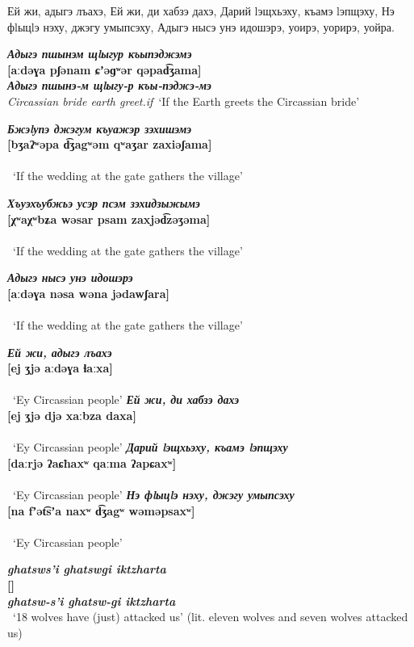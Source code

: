 \documentclass[a4paper,12pt]{book}
\newcommand{\1}[1]{\textbf{\emph{#1}}} %
\newcommand{\2}[1]{\textbf{[#1]}} %
\newcommand{\3}[1]{\fontsize{11pt}{0cm}\textbf{\emph{#1}}} %
\newcommand{\4}[1]{\fontsize{10pt}{0cm}\emph{#1}}	%
\newcommand{\5}[1]{\textbf{/#1/}} %
\newcommand{\6}[1]{\textbf{[#1]}} %
\newcommand{\7}[1]{\fontsize{12pt}{0cm}\emph{#1}} %
\newcommand{\8}[1]{\fontsize{12pt}{0cm}`#1'} %
\newcommand{\9}[1]{\fontsize{12pt}{0cm}(lit. `#1')} %
\begin{document}
Ей жи, адыгэ лъахэ,
Ей жи, ди хабзэ дахэ,
Дарий lэщхьэху, къамэ lэпщэху,
Нэ фlыцlэ нэху, джэгу умыпсэху,
Адыгэ нысэ унэ идошэрэ, уоирэ, уорирэ, уойра.



\begin{exe}
\ex
\1{Адыгэ пшынэм щlыгур къыпэджэмэ}\\
\2{aːdəɣa pʃənam ɕʼəɡʷər qəpad͡ʒama}\\
\3{Адыгэ пшынэ-м щlыгу-р къы-пэджэ-мэ}\\
\4{Circassian bride earth greet.if}\
\trans \8{If the Earth greets the Circassian bride}

\ex
\1{Бжэlупэ джэгум къуажэр зэхишэмэ}\\
\2{bʒaʔʷəpa d͡ʒagʷəm qʷaʒar zaxiəʃama}\\
\3{}\\
\4{}\
\trans \8{If the wedding at the gate gathers the village}


\ex
\1{Хъуэхъубжьэ усэр псэм зэхидзыжымэ}\\
\2{χʷaχʷbʑa wəsar psam zaxjəd͡zəʒəma}\\
\3{}\\
\4{}\
\trans \8{If the wedding at the gate gathers the village}


\ex
\1{Адыгэ нысэ унэ идошэрэ}\\
\2{aːdəɣa nəsa wəna jədawʃara}\\
\3{}\\
\4{}\
\trans \8{If the wedding at the gate gathers the village}

\end{exe}


\begin{exe}
\ex
\1{Ей жи, адыгэ лъахэ}\\
\2{ej ʒjə aːdəɣa ɬaːxa}\\
\3{}\\
\4{}\
\trans \8{Ey Circassian people}
\ex
\1{Ей жи, ди хабзэ дахэ}\\
\2{ej ʒjə djə xaːbza daxa}\\
\3{}\\
\4{}\
\trans \8{Ey Circassian people}
\ex
\1{Дарий lэщхьэху, къамэ lэпщэху}\\
\2{daːrjə ʔaɕħaxʷ qaːma ʔapɕaxʷ}\\
\3{}\\
\4{}\
\trans \8{Ey Circassian people}
\ex
\1{Нэ фlыцlэ нэху, джэгу умыпсэху}\\
\2{na fʼət͡sʼa naxʷ d͡ʒagʷ wəməpsaxʷ}\\
\3{}\\
\4{}\
\trans \8{Ey Circassian people}

\end{exe}




\begin{exe}
\ex
\1{ghatsws'i ghatswgi iktzharta}\\
\2{}\\
\3{ghatsw-s'i ghatsw-gi iktzharta}\\
\4{}\
\trans \8{18 wolves have (just) attacked us} (lit. eleven wolves and seven wolves attacked us)
\end{exe}
\end{document}
